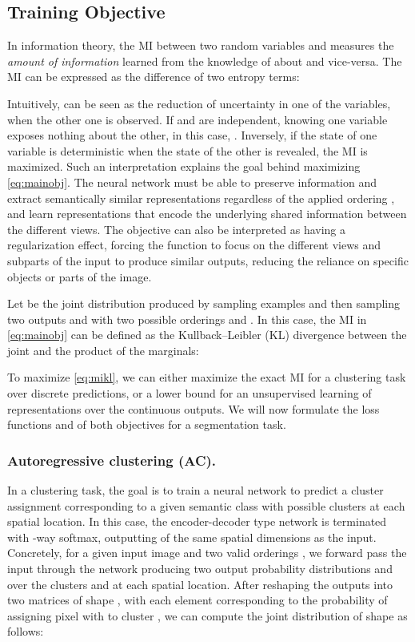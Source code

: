 \subsection{Training Objective} \label{obj}
In information theory, the MI  between two random variables  and 
measures the \textit{amount of information} learned from the knowledge of  
about  and vice-versa. The MI can be expressed as the difference of two entropy terms:

Intuitively,  can be seen as the reduction of uncertainty in one of the 
variables, when the other one is observed. If  and  are independent,
knowing one variable exposes nothing about the other, in this case, .
Inversely, if the state of one variable is deterministic when the state of the other is revealed,
the MI is maximized. Such an interpretation explains the goal behind maximizing
\cref{eq:mainobj}.
The neural network  must be able to preserve information
and extract semantically similar representations regardless of the applied ordering ,
and learn representations that encode the underlying shared information between the different views.
The objective can also be interpreted as having a regularization effect,
forcing the function  to focus 
on the different views and subparts of the input  to produce similar outputs,
reducing the reliance on specific objects or parts of the image.

Let  be the joint distribution produced by
sampling examples  and
then sampling two outputs  and 
with two possible orderings  and .
In this case, the MI in \cref{eq:mainobj} can be defined as the Kullback–Leibler (KL) divergence between
the joint and the product of the marginals:


To maximize \cref{eq:mikl}, we can either maximize the exact MI for a clustering task over discrete predictions,
or a lower bound for an unsupervised learning of representations over the continuous outputs.
We will now formulate the loss functions  and 
of both objectives for a segmentation task.













\subsubsection{Autoregressive clustering (AC).} 
In a clustering task, the goal is to train a neural network  to predict a
cluster assignment corresponding to a given semantic class  with  possible clusters at
each spatial location. 
In this case, the encoder-decoder type 
network  is terminated with -way softmax, outputting
 of the same spatial dimensions as the input.
Concretely, for a given input image  and two valid orderings ,
we forward pass the input through the network
producing two output probability distributions  and
 over the  clusters and at
each spatial location.
After reshaping the outputs into two matrices of shape , with each element
corresponding to the probability of assigning pixel  with  to cluster ,
we can compute the joint distribution  of shape  as follows:

